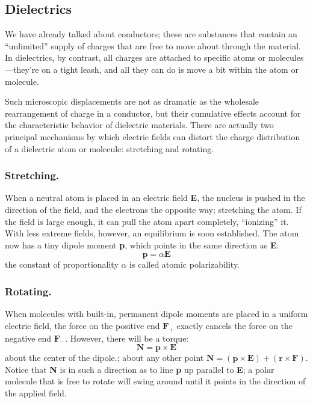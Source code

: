 \documentclass[../../../main.tex]{subfiles}
\begin{document}
\subsection*{Dielectrics}
We have already talked about conductors; these are substances that contain an “unlimited” supply of charges that are free to move about through the material. In dielectrics, by contrast, all charges are attached to specific atoms or molecules—they’re on a tight leash, and all they can do is move a bit within the atom or molecule. 

Such microscopic displacements are not as dramatic as the wholesale rearrangement of charge in a conductor, but their cumulative effects account for the characteristic behavior of dielectric materials. There are actually two principal mechanisms by which electric fields can distort the charge distribution of a dielectric atom or molecule: stretching and rotating. 

\subsubsection*{Stretching.} When a neutral atom is placed in an electric field \textbf{E}, the nucleus is pushed in the direction of the field, and the electrons the opposite way; stretching the atom. If the field is large enough, it can pull the atom apart completely, “ionizing” it. With less extreme fields, however, an equilibrium is soon established. The atom now has a tiny dipole moment \textbf{p}, which points in the same direction as \textbf{E}:
\begin{equation*}
    \mathbf{p} = \alpha \mathbf{E}
\end{equation*}     
the constant of proportionality $\alpha$ is called atomic polarizability. 

\subsubsection*{Rotating.} When molecules with built-in, permanent dipole moments are placed in a uniform electric field, the force on the positive end $\mathbf{F}_+$ exactly cancels the force on the negative end $\mathbf{F}_-$. However, there will be a torque:
\begin{equation*}
    \mathbf{N}=\mathbf{p}\times\mathbf{E}
\end{equation*}
about the center of the dipole.; about any other point $\mathbf{N}=(\mathbf{p}\times\mathbf{E}) + (\mathbf{r}\times \mathbf{F})$. Notice that \textbf{N} is in such a direction as to line \textbf{p} up parallel to \textbf{E}; a polar molecule that is free to rotate will swing around until it points in the direction of the applied field. 
\end{document}
